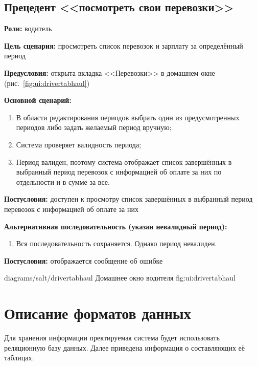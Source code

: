 \subsection{Прецедент <<посмотреть свои перевозки>>}
\textbf{Роли:} водитель \par
\textbf{Цель сценария:} просмотреть список перевозок и 
    зарплату за определённый период \par
\textbf{Предусловия:} открыта вкладка <<Перевозки>> 
    в домашнем окне (рис.~\ref{fig:ui:drivertabhaul}) \par
\textbf{Основной сценарий:} 
\begin{enumerate}
    \item В области редактирования периодов выбрать 
        один из предусмотренных периодов либо задать желаемый период вручную;
    \item Система проверяет валидность периода;
    \item Период валиден, поэтому система отображает список 
        завершённых в выбранный период перевозок с информацией 
        об оплате за них по отдельности и в сумме за все.
\end{enumerate} \par
\textbf{Постусловия:} доступен к просмотру список завершённых 
    в выбранный период перевозок с информацией об оплате за них \par
\textbf{Альтернативная последовательность (указан невалидный период):} \par
\begin{enumerate}
    \item Вся последовательность сохраняется. Однако период невалиден.
\end{enumerate} \par
\textbf{Постусловия:} отображается сообщение об ошибке \par
\image
    {diagrams/salt/drivertabhaul}
    {Домашнее окно водителя}
    {fig:ui:drivertabhaul}



\section{Описание форматов данных}

Для хранения информации пректируемая система будет использовать реляционную
базу данных. Далее приведена информация о составляющих её таблицах.

\newcommand\dbtable[4]{
    Информация о #1 хранится в базе данных в таблице, структура которой
    представлена далее в таблице \ref{table:db:#2}. #4
    \begin{table}[h!]
        \centering
        \caption{Структура таблицы, хранящей информацию о #1}
        \begin{tabularx}{\textwidth}{|X|X|}
            \hline
            Поле & Тип \\
            \hhline{|=:=|}
            #3
        \end{tabularx}
        \label{table:db:#2}
    \end{table}
}

